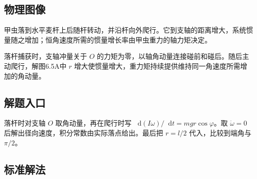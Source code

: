 \documentclass[UTF8,fontset=fandol,a4paper,11pt]{ctexart}
\newcommand{\dd}{\mathop{}\!\mathrm{d}}
\begin{document}


\subsection*{物理图像}

甲虫落到水平麦杆上后随杆转动，并沿杆向外爬行。它到支轴的距离增大，系统惯量随之增加；恒角速度所需的惯量增长率由甲虫重力的轴力矩决定。

落杆捕获时，支轴冲量关于 $O$ 的力矩为零，以轴角动量连接碰前和碰后。随后主动爬行，解图6.5A中 $r$ 增大使惯量增大，重力矩持续提供维持同一角速度所需增加的角动量。



\subsection*{解题入口}

落杆时对支轴 $O$ 取角动量，再在爬行时写 $\dd(I\omega)/\dd t=mgr\cos\varphi$。取 $\dot\omega=0$ 后解出径向速度，积分常数由实际落点给出。最后把 $r=l/2$ 代入，比较到端角与 $\pi/2$。



\subsection*{标准解法}
\end{document}

